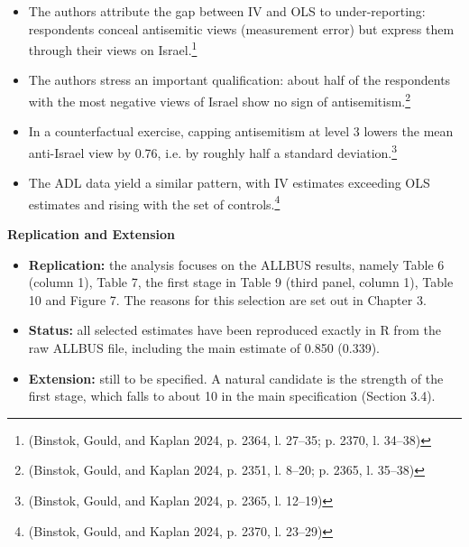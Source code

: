 \begin{itemize}
  \begin{itemize}
  \item
    In the main specification, the coefficient is 0.850 with a standard error of 0.339 (Table 10, column 4, p. 2359; repeated in Table 11).\footnote{(Binstok, Gould, and Kaplan 2024, p. 2362, l. 12--13)}
  \item
    In terms of magnitude, an increase of one standard deviation in antisemitism (factor measure) raises anti-Israel views by about 1.10 standard deviations under IV, compared with 0.18 under OLS.\footnote{(Binstok, Gould, and Kaplan 2024, p. 2364, l. 18--27)}
  \end{itemize}
\item
  The authors attribute the gap between IV and OLS to under-reporting: respondents conceal antisemitic views (measurement error) but express them through their views on Israel.\footnote{(Binstok, Gould, and Kaplan 2024, p. 2364, l. 27--35; p. 2370, l. 34--38)}
\item
  The authors stress an important qualification: about half of the respondents with the most negative views of Israel show no sign of antisemitism.\footnote{(Binstok, Gould, and Kaplan 2024, p. 2351, l. 8--20; p. 2365, l. 35--38)}
\item
  In a counterfactual exercise, capping antisemitism at level 3 lowers the mean anti-Israel view by 0.76, i.e. by roughly half a standard deviation.\footnote{(Binstok, Gould, and Kaplan 2024, p. 2365, l. 12--19)}
\item
  The ADL data yield a similar pattern, with IV estimates exceeding OLS estimates and rising with the set of controls.\footnote{(Binstok, Gould, and Kaplan 2024, p. 2370, l. 23--29)}
\end{itemize}

\par\textbf{Replication and Extension}\par

\begin{itemize}
\item
  \textbf{Replication:} the analysis focuses on the ALLBUS results, namely Table 6 (column 1), Table 7, the first stage in Table 9 (third panel, column 1), Table 10 and Figure 7. The reasons for this selection are set out in Chapter 3.
\item
  \textbf{Status:} all selected estimates have been reproduced exactly in R from the raw ALLBUS file, including the main estimate of 0.850 (0.339).
\item
  \textbf{Extension:} still to be specified. A natural candidate is the strength of the first stage, which falls to about 10 in the main specification (Section 3.4).
\end{itemize}

